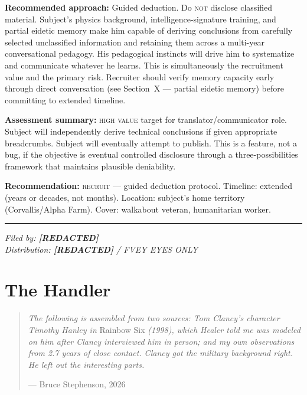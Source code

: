 \textbf{Recommended approach:} Guided deduction. Do \textsc{not} disclose classified material. Subject's physics background, intelligence-signature training, and partial eidetic memory make him capable of deriving conclusions from carefully selected unclassified information and retaining them across a multi-year conversational pedagogy. His pedagogical instincts will drive him to systematize and communicate whatever he learns. This is simultaneously the recruitment value and the primary risk. Recruiter should verify memory capacity early through direct conversation (see Section~X --- partial eidetic memory) before committing to extended timeline.

\textbf{Assessment summary:} \textsc{high value} target for translator/communicator role. Subject will independently derive technical conclusions if given appropriate breadcrumbs. Subject will eventually attempt to publish. This is a feature, not a bug, if the objective is eventual controlled disclosure through a three-possibilities framework that maintains plausible deniability.

\textbf{Recommendation:} \textsc{recruit} --- guided deduction protocol. Timeline: extended (years or decades, not months). Location: subject's home territory (Corvallis/Alpha Farm). Cover: walkabout veteran, humanitarian worker.

\vspace{1cm}\hrule\vspace{0.5cm}

\begin{flushright}\small\textit{%
Filed by: \textbf{[REDACTED]}\\
Distribution: \textbf{[REDACTED]} / FVEY EYES ONLY%
}\end{flushright}

\clearpage


\section*{The Handler}
\label{interlude:the-handler}

\begin{quote}\small
\textit{The following is assembled from two sources: Tom Clancy's character Timothy Hanley in} Rainbow Six \textit{(1998), which Healer told me was modeled on him after Clancy interviewed him in person; and my own observations from 2.7 years of close contact. Clancy got the military background right. He left out the interesting parts.}
\par\raggedleft --- Bruce Stephenson, 2026\end{quote}

